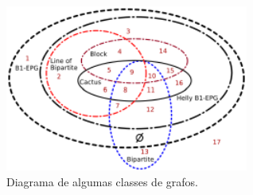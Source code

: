  \begin{figure}[htb]	
 \center%
 \includegraphics[width=8cm]{./img/diagram.pdf}
 \caption{Diagrama de algumas classes de grafos.}
\label{fig:diagram}
\end{figure}  
 